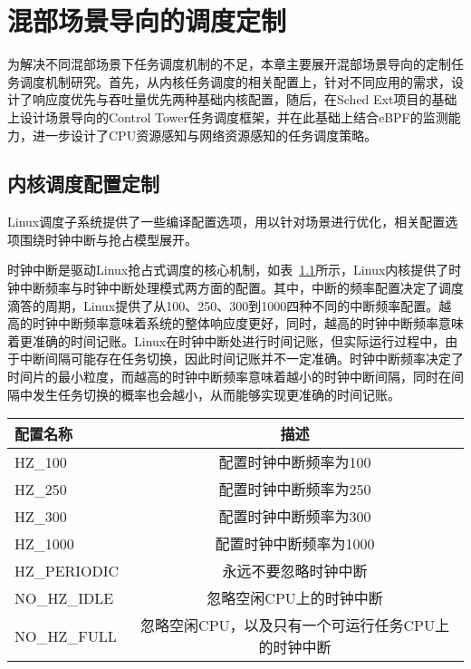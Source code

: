 \chapter{混部场景导向的调度定制}\label{chap:sched_policy}


为解决不同混部场景下任务调度机制的不足，本章主要展开混部场景导向的定制任务调度机制研究。首先，从内核任务调度的相关配置上，针对不同应用的需求，设计了响应度优先与吞吐量优先两种基础内核配置，随后，在Sched Ext项目的基础上设计场景导向的Control Tower任务调度框架，并在此基础上结合eBPF的监测能力，进一步设计了CPU资源感知与网络资源感知的任务调度策略。

\section{内核调度配置定制}

Linux调度子系统提供了一些编译配置选项，用以针对场景进行优化，相关配置选项围绕时钟中断与抢占模型展开。

时钟中断是驱动Linux抢占式调度的核心机制，如表~\ref{tab:config_hz}所示，Linux内核提供了时钟中断频率与时钟中断处理模式两方面的配置。其中，中断的频率配置决定了调度滴答的周期，Linux提供了从100、250、300到1000四种不同的中断频率配置。越高的时钟中断频率意味着系统的整体响应度更好，同时，越高的时钟中断频率意味着更准确的时间记账。Linux在时钟中断处进行时间记账，但实际运行过程中，由于中断间隔可能存在任务切换，因此时间记账并不一定准确。时钟中断频率决定了时间片的最小粒度，而越高的时钟中断频率意味着越小的时钟中断间隔，同时在间隔中发生任务切换的概率也会越小，从而能够实现更准确的时间记账。

\begin{table}[H]
    \label{tab:config_hz}
    \footnotesize%
    \setlength{\tabcolsep}{4pt}%
    \renewcommand{\arraystretch}{1.25}%
    \centering
    \begin{tabular}{lc}
        \hline
        配置名称 & 描述 \\
        \hline
        HZ\_100  & 配置时钟中断频率为100  \\
        HZ\_250  & 配置时钟中断频率为250 \\
        HZ\_300  & 配置时钟中断频率为300 \\
        HZ\_1000 & 配置时钟中断频率为1000 \\
        HZ\_PERIODIC & 永远不要忽略时钟中断 \\
        NO\_HZ\_IDLE & 忽略空闲CPU上的时钟中断 \\
        NO\_HZ\_FULL & 忽略空闲CPU，以及只有一个可运行任务CPU上的时钟中断 \\
        \hline
    \end{tabular}
\end{table}

